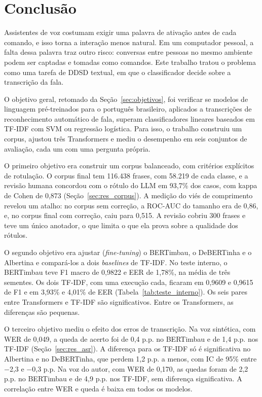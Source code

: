 \documentclass[
    12pt,                %
    openright,           %
    oneside,             %
    a4paper,             %
    english,             %
    brazil               %
]{abntex2}
\begin{document}
\chapter{Conclusão}
\label{cap:conclusao}

Assistentes de voz costumam exigir uma palavra de ativação antes de cada comando, e isso torna a interação menos natural. Em um computador pessoal, a falta dessa palavra traz outro risco: conversas entre pessoas no mesmo ambiente podem ser captadas e tomadas como comandos. Este trabalho tratou o problema como uma tarefa de DDSD textual, em que o classificador decide sobre a transcrição da fala.

O objetivo geral, retomado da Seção~\ref{sec:objetivos}, foi verificar se modelos de linguagem pré-treinados para o português brasileiro, aplicados a transcrições de reconhecimento automático de fala, superam classificadores lineares baseados em TF-IDF com SVM ou regressão logística. Para isso, o trabalho construiu um corpus, ajustou três Transformers e mediu o desempenho em seis conjuntos de avaliação, cada um com uma pergunta própria.

O primeiro objetivo era construir um corpus balanceado, com critérios explícitos de rotulação. O corpus final tem 116.438 frases, com 58.219 de cada classe, e a revisão humana concordou com o rótulo do LLM em 93,7\% dos casos, com kappa de Cohen de 0,873 (Seção~\ref{sec:res_corpus}). A medição do viés de comprimento revelou um atalho: no corpus sem correção, a ROC-AUC do tamanho era de 0,86, e, no corpus final com correção, caiu para 0,515. A revisão cobriu 300 frases e teve um único anotador, o que limita o que ela prova sobre a qualidade dos rótulos.

O segundo objetivo era ajustar (\textit{fine-tuning}) o BERTimbau, o DeBERTinha e o Albertina e compará-los a dois \textit{baselines} de TF-IDF. No teste interno, o BERTimbau teve F1 macro de 0,9822 e EER de 1,78\%, na média de três sementes. Os dois TF-IDF, com uma execução cada, ficaram em 0,9609 e 0,9615 de F1 e em 3,93\% e 4,01\% de EER (Tabela~\ref{tab:teste_interno}). Os seis pares entre Transformers e TF-IDF são significativos. Entre os Transformers, as diferenças são pequenas.

O terceiro objetivo mediu o efeito dos erros de transcrição. Na voz sintética, com WER de 0,049, a queda de acerto foi de 0,4 p.p. no BERTimbau e de 1,4 p.p. nos TF-IDF (Seção~\ref{sec:res_asr}). A diferença para os TF-IDF só é significativa no Albertina e no DeBERTinha, que perdem 1,2 p.p. a menos, com IC de 95\% entre $-$2,3 e $-$0,3 p.p. Na voz do autor, com WER de 0,170, as quedas foram de 2,2 p.p. no BERTimbau e de 4,9 p.p. nos TF-IDF, sem diferença significativa. A correlação entre WER e queda é baixa em todos os modelos.
\end{document}
